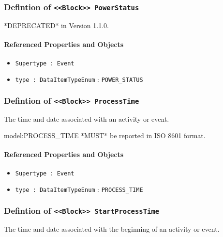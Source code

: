\subsubsection{Defintion of \texttt{<<Block>> PowerStatus}}
  \label{type:PowerStatus}

\FloatBarrier

*DEPRECATED* in Version 1.1.0.

\FloatBarrier
\paragraph{Referenced Properties and Objects}

\begin{itemize}
\item \texttt{Supertype : Event}

\item \texttt{type : DataItemTypeEnum} : \texttt{POWER_STATUS}

\end{itemize}
\FloatBarrier
\subsubsection{Defintion of \texttt{<<Block>> ProcessTime}}
  \label{type:ProcessTime}

\FloatBarrier

The time and date associated with an activity or event.
  
 {model:PROCESS_TIME} *MUST* be reported in ISO 8601 format.

\FloatBarrier
\paragraph{Referenced Properties and Objects}

\begin{itemize}
\item \texttt{Supertype : Event}

\item \texttt{type : DataItemTypeEnum} : \texttt{PROCESS_TIME}

\end{itemize}
\FloatBarrier
\subsubsection{Defintion of \texttt{<<Block>> StartProcessTime}}
  \label{type:StartProcessTime}

\FloatBarrier

The time and date associated with the beginning of an activity or event.

